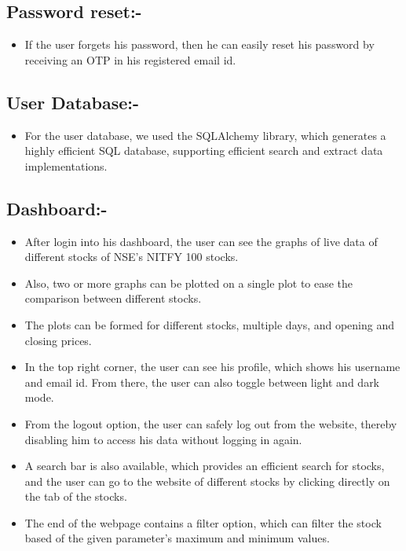 \documentclass[11pt]{article}
\begin{document}
\subsection{Password reset:-}
\begin{itemize}
    \item If the user forgets his password, then he can easily reset his password by receiving an OTP in his registered email id.
\end{itemize}

\subsection{User Database:-}
\begin{itemize}
    \item For the user database, we used the SQLAlchemy library, which generates a highly efficient SQL database, supporting efficient search and extract data implementations.
\end{itemize}

\subsection{Dashboard:-}
\begin{itemize}
    \item After login into his dashboard, the user can see the graphs of live data of different stocks of NSE's NITFY 100 stocks.
    \item Also, two or more graphs can be plotted on a single plot to ease the comparison between different stocks.
    \item The plots can be formed for different stocks, multiple days, and opening and closing prices.
    \item In the top right corner, the user can see his profile, which shows his username and email id. From there, the user can also toggle between light and dark mode.
    \item From the logout option, the user can safely log out from the website, thereby disabling him to access his data without logging in again.
    \item A search bar is also available, which provides an efficient search for stocks, and the user can go to the website of different stocks by clicking directly on the tab of the stocks.
    \item The end of the webpage contains a filter option, which can filter the stock based of the given parameter's maximum and minimum values.
\end{itemize}
\end{document}
